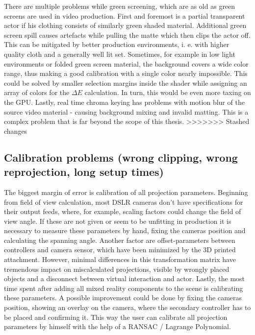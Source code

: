 There are multiple problems while green screening, which are as old as green 
screens are used in video production. First and foremost is a partial 
transparent actor if his clothing consists of similarly green shaded material.
\newline
Additional green screen spill causes artefacts while pulling the matte which 
then clips the actor off. This can be mitigated by better production 
environments, i. e. with higher quality cloth and a generally well lit set. 
Sometimes, for example in low light environments or folded green screen 
material, the background covers a wide color range, thus making a good 
calibration with a single color nearly impossible. This could be solved by 
smaller selection margins inside the shader while assigning an array of colors 
for the $\Delta E$ calculation. In turn, this would be even more taxing on the 
GPU.
\newline
Lastly, real time chroma keying has problems with motion blur of the source 
video material - causing background mixing and invalid matting. This is a 
complex problem that is far beyond the scope of this thesis.
>>>>>>> Stashed changes

\subsection{Calibration problems (wrong clipping, wrong reprojection, long 
setup times)}

The biggest margin of error is calibration of all projection parameters.
\newline
Beginning from field of view calculation, most DSLR cameras don't have 
specifications for their output feeds, where, for example, scaling factors 
could change the field of view angle. If these are not given or seem to be 
unfitting in production it is necessary to measure these parameters by hand, 
fixing the cameras position and calculating the spanning angle.
Another factor are offset-parameters between controllers and camera sensor, 
which have been minimized by the 3D printed attachment. However, minimal 
differences in this transformation matrix have tremendous impact on 
miscalculated projections, visible by wrongly placed objects and a disconnect 
between virtual interaction and actor.
Lastly, the most time spent after adding all mixed reality components to the 
scene is calibrating these parameters. A possible improvement could be done by 
fixing the cameras position, showing an overlay on the camera, where the 
secondary controller has to be placed and confirming it. This way the user can 
calibrate all projection parameters by himself with the help of a RANSAC / 
Lagrange Polynomial.
